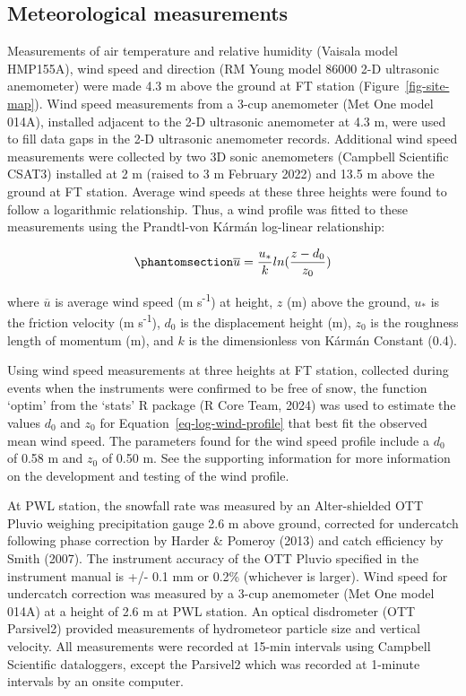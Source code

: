 \documentclass[
  letterpaper,
  DIV=11,
  numbers=noendperiod]{scrartcl}
\begin{document}
\subsection{Meteorological
measurements}\label{meteorological-measurements}

Measurements of air temperature and relative humidity (Vaisala model
HMP155A), wind speed and direction (RM Young model 86000 2-D ultrasonic
anemometer) were made 4.3 m above the ground at FT station
(Figure~\ref{fig-site-map}). Wind speed measurements from a 3-cup
anemometer (Met One model 014A), installed adjacent to the 2-D
ultrasonic anemometer at 4.3 m, were used to fill data gaps in the 2-D
ultrasonic anemometer records. Additional wind speed measurements were
collected by two 3D sonic anemometers (Campbell Scientific CSAT3)
installed at 2 m (raised to 3 m February 2022) and 13.5 m above the
ground at FT station. Average wind speeds at these three heights were
found to follow a logarithmic relationship. Thus, a wind profile was
fitted to these measurements using the Prandtl-von Kármán log-linear
relationship:

\begin{equation}\phantomsection\label{eq-log-wind-profile}{
\overline{u} = \frac{u_*}{k} ln(\frac{z - d_0}{z_0})
}\end{equation}

where \(\overline{u}\) is average wind speed (m s\textsuperscript{-1})
at height, \(z\) (m) above the ground, \(u_*\) is the friction velocity
(m s\textsuperscript{-1}), \(d_0\) is the displacement height (m),
\(z_0\) is the roughness length of momentum (m), and \(k\) is the
dimensionless von Kármán Constant (0.4).

Using wind speed measurements at three heights at FT station, collected
during events when the instruments were confirmed to be free of snow,
the function `optim' from the `stats' R package (R Core Team, 2024) was
used to estimate the values \(d_0\) and \(z_0\) for
Equation~\ref{eq-log-wind-profile} that best fit the observed mean wind
speed. The parameters found for the wind speed profile include a \(d_0\)
of 0.58 m and \(z_0\) of 0.50 m. See the supporting information for more
information on the development and testing of the wind profile.

At PWL station, the snowfall rate was measured by an Alter-shielded OTT
Pluvio weighing precipitation gauge 2.6 m above ground, corrected for
undercatch following phase correction by Harder \& Pomeroy (2013) and
catch efficiency by Smith (2007). The instrument accuracy of the OTT
Pluvio specified in the instrument manual is +/- 0.1 mm or 0.2\%
(whichever is larger). Wind speed for undercatch correction was measured
by a 3-cup anemometer (Met One model 014A) at a height of 2.6 m at PWL
station. An optical disdrometer (OTT Parsivel2) provided measurements of
hydrometeor particle size and vertical velocity. All measurements were
recorded at 15-min intervals using Campbell Scientific dataloggers,
except the Parsivel2 which was recorded at 1-minute intervals by an
onsite computer.
\end{document}
